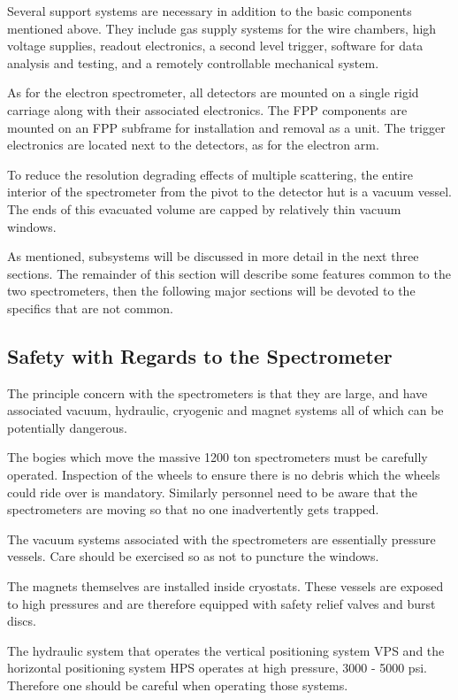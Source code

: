 Several support systems are necessary in addition to the basic 
components mentioned above.  They include gas supply systems for the 
wire chambers, high voltage supplies, readout electronics, a second 
level trigger, software for data analysis and testing, and a remotely 
controllable mechanical system.

As for the electron spectrometer, all detectors are mounted on a 
single rigid carriage along with their associated electronics.  The FPP 
components are mounted on an FPP subframe for installation and removal as 
a unit.  The trigger electronics are located next to the detectors, 
as for the electron arm.

To reduce the resolution degrading effects of multiple scattering, the 
entire interior of the spectrometer from the pivot to the detector hut 
is a vacuum vessel.  The ends of this evacuated volume are capped by 
relatively thin vacuum windows.

As mentioned, subsystems will be discussed in more detail in the next 
three sections.  The remainder of this section will describe some 
features common to the two spectrometers, then the following major 
sections will be devoted to the specifics that are not common.


\subsection{Safety with Regards to the Spectrometer}

The principle concern with the spectrometers is that they are large, 
and have associated vacuum, hydraulic, cryogenic and magnet systems all of 
which can be potentially dangerous.

The bogies which move the massive 1200 ton spectrometers must be 
carefully operated.  Inspection of the wheels to ensure there is no 
debris which the wheels could ride over is mandatory.  Similarly 
personnel need to be aware that the spectrometers are moving so that no one 
inadvertently gets trapped.

The vacuum systems associated with the spectrometers are essentially 
pressure vessels.  Care should be exercised so as not to puncture the 
windows.

The magnets themselves are installed inside cryostats.  These vessels 
are exposed to high pressures and are therefore equipped with safety 
relief valves and burst discs.

The hydraulic system that operates the vertical positioning system VPS 
and the horizontal positioning system HPS operates at high pressure, 
3000 - 5000 psi.  Therefore one should be careful when operating those 
systems.

